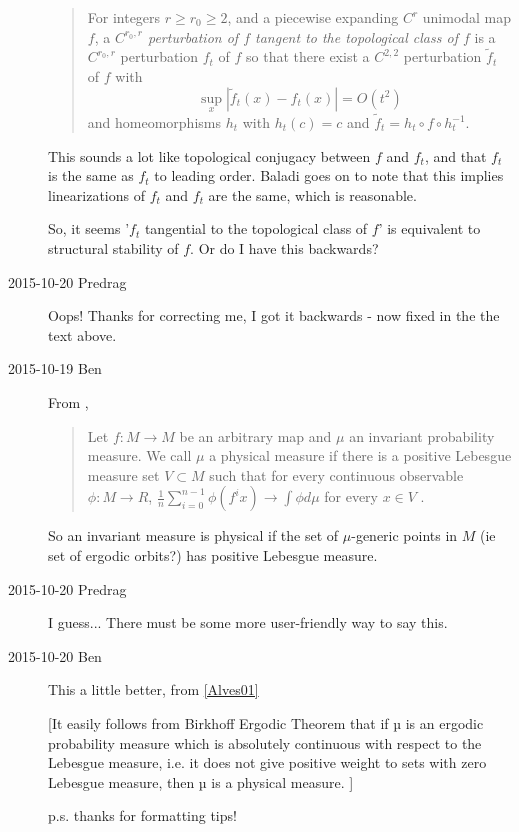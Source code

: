 \begin{description}
\begin{quote}
For  integers $r \ge r_0 \ge 2$, and a piecewise expanding $C^{r}$ unimodal map
$f$, a {\it $C^{r_0,r}$ perturbation of $f$ tangent to the topological class of $f$}
is a $C^{r_0, r}$ perturbation $f_t$ of $f$ so that
there exist a $C^{2,2}$ perturbation
$\tilde f_t$ of $f$  with
$$\sup_x|\tilde f_t(x)-f_t(x)|=O(t^2)$$
and
homeomorphisms $h_t$  with $h_t(c)=c$ and
$\tilde f_t=h_t \circ f \circ h_t^{-1}$.
\end{quote}


This sounds a lot like topological conjugacy between $f$ and $f^{~}_{t}$,
and that $f^{~}_{t}$ is the same as $f_{t}$ to leading order. Baladi goes
on to note that this implies linearizations of $f_{t}$ and $f^{~}_{t}$
are the same, which is reasonable.

So, it seems '$f_{t}$ tangential to the topological class of $f$' is
equivalent to structural stability of $f$. Or do I have this backwards?

\item[2015-10-20 Predrag] Oops! Thanks for correcting me, I got it
backwards - now fixed in the the text above.

\item[2015-10-19 Ben]
From ,

\begin{quote}
Let $f : M \to M$ be an arbitrary map and $\mu$ an invariant probability
measure. We call $\mu$ a physical measure if there is a positive Lebesgue
measure set $V \subset M$ such that for every continuous observable $\phi
: M \to R$, $\frac{1}{n}\sum^{n-1}_{i=0} \phi(f^{i}x) \rightarrow \int
\phi d\mu$ for every $x \in V$ .
\end{quote}

So an invariant measure is physical if the set of $\mu$-generic points in
$M$ (ie set of ergodic orbits?) has positive Lebesgue measure.

\item[2015-10-20 Predrag] I guess... There must be some more
user-friendly way to say this.

\item[2015-10-20 Ben] This a little better, from \ref{Alves01}

[It easily follows from Birkhoff Ergodic Theorem that if
µ is an ergodic probability measure which is absolutely
continuous with respect to the Lebesgue measure, i.e. it
does not give positive weight to sets with zero Lebesgue
measure, then µ is a physical measure. ]

p.s. thanks for formatting tips!

\end{description}
